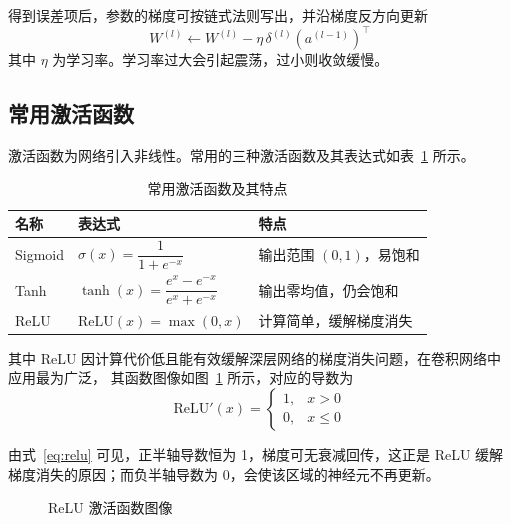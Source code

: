 得到误差项后，参数的梯度可按链式法则写出，并沿梯度反方向更新
\begin{equation}
  W^{(l)} \leftarrow W^{(l)} - \eta \, \delta^{(l)} \left( a^{(l-1)} \right)^{\top}
  \label{eq:update}
\end{equation}
其中 $\eta$ 为学习率。学习率过大会引起震荡，过小则收敛缓慢。

\subsection{常用激活函数}

激活函数为网络引入非线性。常用的三种激活函数及其表达式如表~\ref{tab:activation} 所示。

\begin{table}[htbp]
  \centering
  \caption{常用激活函数及其特点}
  \label{tab:activation}
  \begin{tabular}{lll}
    \toprule
    名称 & 表达式 & 特点 \\
    \midrule
    Sigmoid & $\sigma(x) = \dfrac{1}{1 + e^{-x}}$ & 输出范围 $(0,1)$，易饱和 \\
    Tanh & $\tanh(x) = \dfrac{e^{x} - e^{-x}}{e^{x} + e^{-x}}$ & 输出零均值，仍会饱和 \\
    ReLU & $\mathrm{ReLU}(x) = \max(0, x)$ & 计算简单，缓解梯度消失 \\
    \bottomrule
  \end{tabular}
\end{table}

其中 ReLU 因计算代价低且能有效缓解深层网络的梯度消失问题，在卷积网络中应用最为广泛，
其函数图像如图~\ref{fig:relu} 所示，对应的导数为
\begin{equation}
  \mathrm{ReLU}'(x) =
  \begin{cases}
    1, & x > 0 \\
    0, & x \le 0
  \end{cases}
  \label{eq:relu}
\end{equation}

由式~\ref{eq:relu} 可见，正半轴导数恒为 1，梯度可无衰减回传，这正是 ReLU 缓解
梯度消失的原因；而负半轴导数为 0，会使该区域的神经元不再更新。

\begin{figure}[htbp]
  \centering
  \caption{ReLU 激活函数图像}
  \label{fig:relu}
\end{figure}


